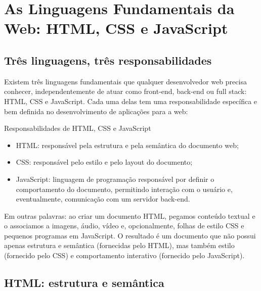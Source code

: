 \chapter{As Linguagens Fundamentais da Web: HTML, CSS e JavaScript}

\section{Três linguagens, três responsabilidades}

Existem três linguagens fundamentais que qualquer desenvolvedor web precisa conhecer, independentemente de atuar como front-end, back-end ou full stack: HTML, CSS e JavaScript. Cada uma delas tem uma responsabilidade específica e bem definida no desenvolvimento de aplicações para a web:

Responsabilidades de HTML, CSS e JavaScript

\begin{itemize}
  \item HTML: responsável pela estrutura e pela semântica do documento web;
\end{itemize}

\begin{itemize}
  \item CSS: responsável pelo estilo e pelo layout do documento;
\end{itemize}

\begin{itemize}
  \item JavaScript: linguagem de programação responsável por definir o comportamento do documento, permitindo interação com o usuário e, eventualmente, comunicação com um servidor back-end.
\end{itemize}

Em outras palavras: ao criar um documento HTML, pegamos conteúdo textual e o associamos a imagens, áudio, vídeo e, opcionalmente, folhas de estilo CSS e pequenos programas em JavaScript. O resultado é um documento que não possui apenas estrutura e semântica (fornecidas pelo HTML), mas também estilo (fornecido pelo CSS) e comportamento interativo (fornecido pelo JavaScript).

\section{HTML: estrutura e semântica}

